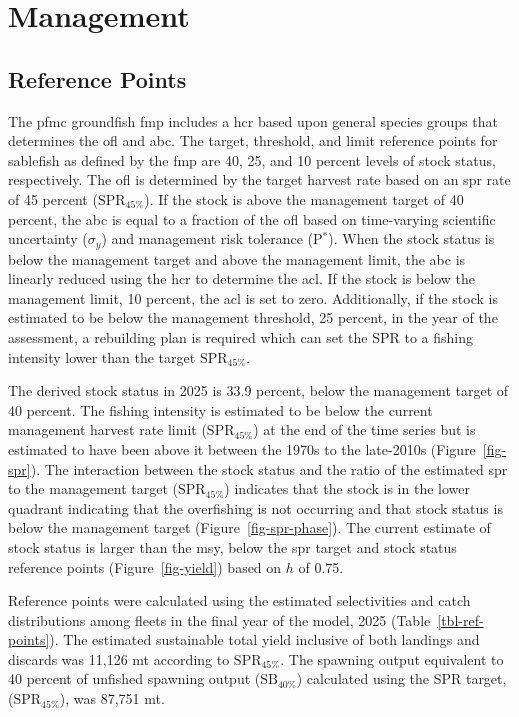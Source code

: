\documentclass[
  english,
]{article}
\begin{document}
\newpage{}

\section{Management}\label{management}

\subsection{Reference Points}\label{reference-points-1}

The \gls{pfmc} groundfish \gls{fmp} includes a \gls{hcr} based upon
general species groups that determines the \gls{ofl} and \gls{abc}. The
target, threshold, and limit reference points for sablefish as defined
by the \gls{fmp} are 40, 25, and 10 percent levels of stock status,
respectively. The \gls{ofl} is determined by the target harvest rate
based on an \gls{spr} rate of 45 percent (\(\text{SPR}_{45\%}\)). If the
stock is above the management target of 40 percent, the \gls{abc} is
equal to a fraction of the \gls{ofl} based on time-varying scientific
uncertainty (\(\sigma_y\)) and management risk tolerance (P\(^*\)). When
the stock status is below the management target and above the management
limit, the \gls{abc} is linearly reduced using the \gls{hcr} to
determine the \gls{acl}. If the stock is below the management limit, 10
percent, the \gls{acl} is set to zero. Additionally, if the stock is
estimated to be below the management threshold, 25 percent, in the year
of the assessment, a rebuilding plan is required which can set the
\(\text{SPR}\) to a fishing intensity lower than the target
\(\text{SPR}_{45\%}\).

The derived stock status in 2025 is 33.9 percent, below the management
target of 40 percent. The fishing intensity is estimated to be below the
current management harvest rate limit (\(\text{SPR}_{45\%}\)) at the end
of the time series but is estimated to have been above it between the
1970s to the late-2010s (Figure~\ref{fig-spr}). The interaction between
the stock status and the ratio of the estimated \gls{spr} to the
management target (\(\text{SPR}_{45\%}\)) indicates that the stock is in
the lower quadrant indicating that the overfishing is not occurring and
that stock status is below the management target
(Figure~\ref{fig-spr-phase}). The current estimate of stock status is
larger than the \gls{msy}, below the \gls{spr} target and stock status
reference points (Figure~\ref{fig-yield}) based on \(h\) of 0.75.

Reference points were calculated using the estimated selectivities and
catch distributions among fleets in the final year of the model, 2025
(Table~\ref{tbl-ref-points}). The estimated sustainable total yield
inclusive of both landings and discards was 11,126 mt according to
\(\text{SPR}_{45\%}\). The spawning output equivalent to 40 percent of
unfished spawning output (\(\text{SB}_{40\%}\)) calculated using the SPR
target, (\(\text{SPR}_{45\%}\)), was 87,751 mt.
\end{document}
